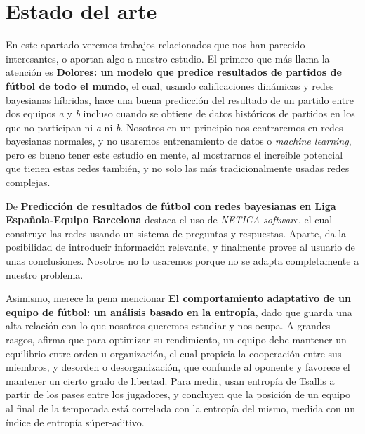 \chapter{Estado del arte}

En este apartado veremos trabajos relacionados que 
nos han parecido interesantes, o aportan algo a 
nuestro estudio. El primero que más llama la atención es 
\textbf{Dolores: un modelo que predice resultados de
partidos de fútbol de todo el mundo}\cite{dolores}, el 
cual, usando calificaciones dinámicas y redes bayesianas 
híbridas, hace una buena predicción del resultado de un partido 
entre dos equipos \textit{a} y \textit{b} incluso cuando 
se obtiene de datos históricos de partidos 
en los que no participan ni \textit{a} ni \textit{b}. Nosotros en un principio nos 
centraremos en redes bayesianas normales, y no usaremos entrenamiento de datos o \textit{machine learning}, 
pero es bueno tener este estudio en mente, al mostrarnos el increíble potencial que tienen estas redes también, 
y no solo las más tradicionalmente usadas redes complejas.

De  \textbf{Predicción de resultados de fútbol con redes bayesianas en
Liga Española-Equipo Barcelona}\cite{prediction-barcelona} destaca el uso de 
\textit{NETICA software}\cite{netica}, el cual construye las redes usando un sistema de 
preguntas y respuestas. Aparte, da la posibilidad de introducir información relevante, y 
finalmente provee al usuario de unas conclusiones. Nosotros no lo usaremos porque no se 
adapta completamente a nuestro problema.

Asimismo, merece la pena mencionar \textbf{El comportamiento adaptativo de un equipo 
de fútbol: un análisis basado en la entropía}\cite{entropy-analysis}, dado que guarda una 
alta relación con lo que nosotros queremos estudiar y nos ocupa. A grandes rasgos, afirma que 
para optimizar su rendimiento, un equipo debe mantener un equilibrio entre orden u organización, el cual 
propicia la cooperación entre sus miembros, y desorden o desorganización, que confunde 
al oponente y favorece el mantener un cierto grado de libertad. Para medir, usan entropía de 
Tsallis a partir de los pases entre los jugadores, y concluyen que la posición de un equipo al final de la temporada está 
correlada con la entropía del mismo, medida con un índice de entropía súper-aditivo. 

